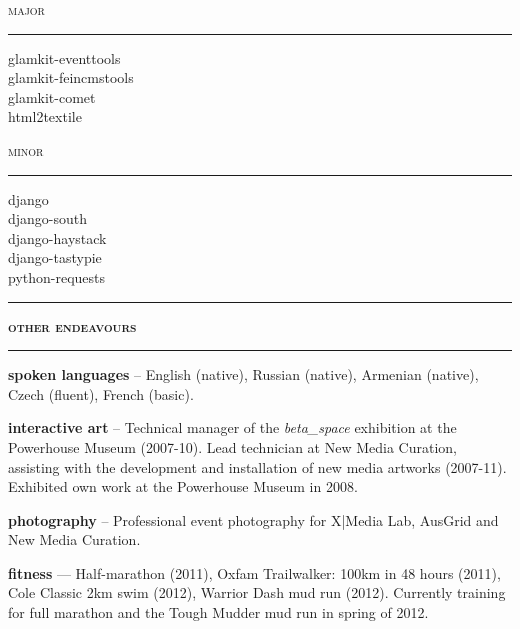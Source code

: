 \documentclass[a4paper,12pt]{article}
\begin{document}
\begin{spacing}{0.95}
\begin{minipage}[t]{95.5mm}
	\begin{minipage}[t]{45.25mm}
		{\large\textsc{major}}\\
		\vspace{-3.1mm}%
		\rule[3mm]{\linewidth}{0.25mm}
				
		{\normalsize
		glamkit-eventtools\\
		glamkit-feincmstools\\
		glamkit-comet\\
		html2textile}
	\end{minipage}%
	\hspace{5mm}%
	\begin{minipage}[t]{45.25mm}
		{\large\textsc{minor}}\\
		\vspace{-3.1mm}%
		\rule[3mm]{\linewidth}{0.25mm}
		
		{\normalsize
		django\\
		django-south\\
		django-haystack\\
		django-tastypie\\
		python-requests}
	\end{minipage}

	\vspace{4mm}
	\rule[1mm]{\linewidth}{1mm}
	{\Large\textsc{\textbf{other endeavours}}}\\
	\vspace{2.5mm}%
	\rule[1mm]{\linewidth}{1mm}
	
	{\small
	\textbf{\textsf{spoken languages}} -- English (native), Russian (native), Armenian (native), Czech (fluent), French (basic).
	
	\vspace{3mm}
	\textbf{\textsf{interactive art}} -- Technical manager of the \emph{beta\_space} exhibition at the Powerhouse Museum (2007-10). Lead technician at New Media Curation, assisting with the development and installation of  new media artworks (2007-11). Exhibited own work at the Powerhouse Museum in 2008.
	
	\vspace{3mm}
	\textbf{\textsf{photography}} -- Professional event photography for X|Media Lab, AusGrid and New Media Curation.
	
	\vspace{3mm}
	\textbf{\textsf{fitness}} --- Half-marathon (2011), Oxfam Trailwalker: 100km in 48 hours (2011), Cole Classic 2km swim (2012), Warrior Dash mud run (2012). Currently training for full marathon and the Tough Mudder mud run in spring of 2012.%
	}%
\end{minipage}\\
\vspace{1mm}


\end{spacing}
\end{document}
